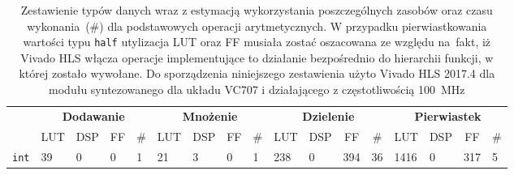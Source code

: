 \begin{landscape}
\phantom{\rule{1em}{6em}}
\begin{table}[H]
\centering
\caption[Zestawienie typów danych wraz z estymacją wykorzystania poszczególnych zasobów oraz czasu wykonania dla podstawowych operacji arytmetycznych]{Zestawienie typów danych wraz z estymacją wykorzystania poszczególnych zasobów oraz czasu wykonania~(\#) dla podstawowych operacji arytmetycznych. W przypadku pierwiastkowania wartości typu \texttt{half} utylizacja LUT oraz FF musiała zostać oszacowana ze względu na~fakt, iż Vivado HLS włącza operacje implementujące to działanie bezpośrednio do hierarchii funkcji, w której zostało wywołane. Do sporządzenia niniejszego zestawienia użyto Vivado HLS 2017.4 dla modułu syntezowanego dla układu VC707 i działającego z częstotliwością 100~MHz}
\label{ch3:tab:op_type_util_time}
\begin{tabular}{|r|l|l|l|l||l|l|l|l||l|l|l|l||l|l|l|l|}
\hline
\multicolumn{1}{|l|}{\multirow{2}{*}{}}           & \multicolumn{4}{c||}{\textbf{Dodawanie}}                                                                       & \multicolumn{4}{c||}{\textbf{Mnożenie}}                                                                       & \multicolumn{4}{c||}{\textbf{Dzielenie}}                                                                      & \multicolumn{4}{c|}{\textbf{Pierwiastek}}                                                                    \\ \cline{2-17} 
\multicolumn{1}{|l|}{}                            & \multicolumn{1}{c|}{LUT} & \multicolumn{1}{c|}{DSP} & \multicolumn{1}{c|}{FF} & \multicolumn{1}{c||}{\#} & \multicolumn{1}{c|}{LUT} & \multicolumn{1}{c|}{DSP} & \multicolumn{1}{c|}{FF} & \multicolumn{1}{c||}{\#} & \multicolumn{1}{c|}{LUT} & \multicolumn{1}{c|}{DSP} & \multicolumn{1}{c|}{FF} & \multicolumn{1}{c||}{\#} & \multicolumn{1}{c|}{LUT} & \multicolumn{1}{c|}{DSP} & \multicolumn{1}{c|}{FF} & \multicolumn{1}{c|}{\#} \\ \hline
\texttt{int}                                      & 39                       & 0                        & 0                       & 1                             & 21                       & 3                        & 0                       & 1                            & 238                      & 0                        & 394                     & 36                           & 1416                     & 0                        & 317                     & 5                            \\ \hline

\end{tabular}
\end{table}
\end{landscape}
